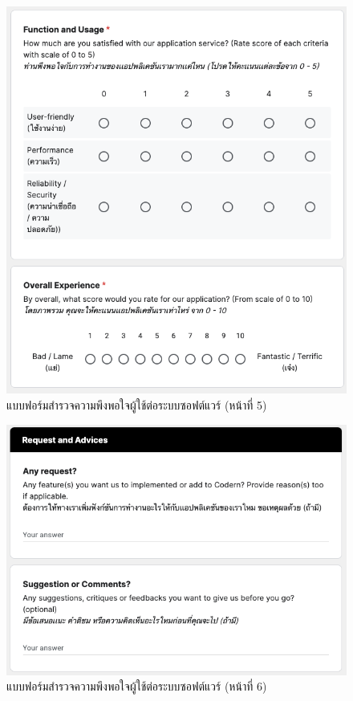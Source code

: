 \documentclass[12pt,one side,openright,a4paper]{cpe-thesis-th}
\begin{document}
\begin{figure}[H]
  \centering
  \includegraphics[width=15cm]{figure/results/forms/survey-google-p3-2.png}
  \caption[แบบฟอร์มสำรวจความพึงพอใจผู้ใช้ต่อระบบซอฟต์แวร์ (หน้าที่ 5)]{แบบฟอร์มสำรวจความพึงพอใจผู้ใช้ต่อระบบซอฟต์แวร์ (หน้าที่ 5)}
\end{figure}

\begin{figure}[H]
  \centering
  \includegraphics[width=15cm]{figure/results/forms/survey-google-p3-3.png}
  \caption[แบบฟอร์มสำรวจความพึงพอใจผู้ใช้ต่อระบบซอฟต์แวร์ (หน้าที่ 6)]{แบบฟอร์มสำรวจความพึงพอใจผู้ใช้ต่อระบบซอฟต์แวร์ (หน้าที่ 6)}
\end{figure}
\end{document}
